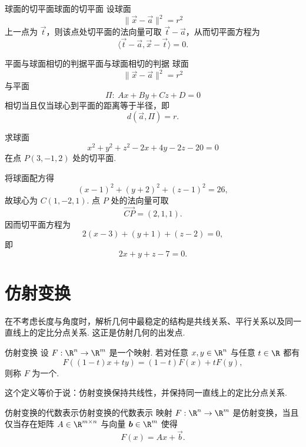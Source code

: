 \begin{theorem}{球面的切平面}{球面的切平面}
    设球面
    \[
        \|\vec{x} - \vec{a}\|^2 = r^2
    \]
    上一点为 $\vec{t}$，则该点处切平面的法向量可取 $\vec{t} - \vec{a}$，从而切平面方程为
    \[
        \langle \vec{t} - \vec{a}, \vec{x} - \vec{t} \rangle = 0.
    \]
\end{theorem}

\begin{theorem}{平面与球面相切的判据}{平面与球面相切的判据}
    球面
    \[
        \|\vec{x} - \vec{a}\|^2 = r^2
    \]
    与平面
    \[
        \Pi:\ A x + B y + C z + D = 0
    \]
    相切当且仅当球心到平面的距离等于半径，即
    \[
        d(\vec{a}, \Pi) = r.
    \]
\end{theorem}

\begin{example}{}{}
    求球面
    \[
        x^2 + y^2 + z^2 - 2x + 4y - 2z - 20 = 0
    \]
    在点 $P(3, -1, 2)$ 处的切平面.
\end{example}

\begin{solution}
    将球面配方得
    \[
        (x - 1)^2 + (y + 2)^2 + (z - 1)^2 = 26,
    \]
    故球心为 $C(1, -2, 1)$. 点 $P$ 处的法向量可取
    \[
        \overrightarrow{CP} = (2, 1, 1).
    \]
    因而切平面方程为
    \[
        2(x - 3) + (y + 1) + (z - 2) = 0,
    \]
    即
    \[
        2x + y + z - 7 = 0.
    \]
\end{solution}

\section{仿射变换}

在不考虑长度与角度时，解析几何中最稳定的结构是共线关系、平行关系以及同一直线上的定比分点关系. 这正是仿射几何的出发点.

\begin{definition}{仿射变换}{}
    设 $F:\R^n \to \R^m$ 是一个映射. 若对任意 $x, y \in \R^n$ 与任意 $t \in \R$ 都有
    \[
        F((1 - t)x + t y) = (1 - t)F(x) + t F(y),
    \]
    则称 $F$ 为一个.
\end{definition}

这个定义等价于说：仿射变换保持共线性，并保持同一直线上的定比分点关系.

\begin{theorem}{仿射变换的代数表示}{仿射变换的代数表示}
    映射 $F:\R^n \to \R^m$ 是仿射变换，当且仅当存在矩阵 $A \in \R^{m\times n}$ 与向量 $\vec{b} \in \R^m$ 使得
    \[
        F(x) = A x + \vec{b}.
    \]
\end{theorem}

